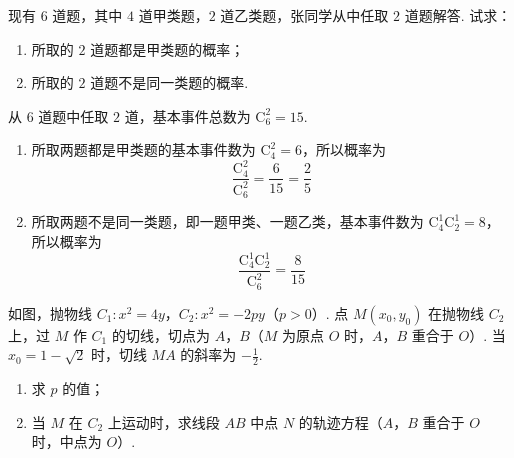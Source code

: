 \begin{problem}
现有 \(6\) 道题，其中 \(4\) 道甲类题，\(2\) 道乙类题，张同学从中任取 \(2\) 道题解答. 试求：

\begin{enumerate}
\item 所取的 \(2\) 道题都是甲类题的概率；
\item 所取的 \(2\) 道题不是同一类题的概率.
\end{enumerate}
\end{problem}

\begin{solution}
从 \(6\) 道题中任取 \(2\) 道，基本事件总数为
\(\mathrm C_6^2=15\).
\begin{enumerate}
\item 所取两题都是甲类题的基本事件数为 \(\mathrm C_4^2=6\)，所以概率为
\[
\frac{\mathrm C_4^2}{\mathrm C_6^2}=\frac6{15}=\frac25
\]

\item 所取两题不是同一类题，即一题甲类、一题乙类，基本事件数为
\(\mathrm C_4^1\mathrm C_2^1=8\)，所以概率为
\[
\frac{\mathrm C_4^1\mathrm C_2^1}{\mathrm C_6^2}=\frac8{15}
\]
\end{enumerate}
\end{solution}

\begin{problem}
如图，抛物线 \(C_{1}:x^{2} = 4y\)，\(C_{2}:x^{2} = -2py\)（\(p > 0\)）. 点 \(M(x_{0}, y_{0})\) 在抛物线 \(C_{2}\) 上，过 \(M\) 作 \(C_{1}\) 的切线，切点为 \(A\)，\(B\)（\(M\) 为原点 \(O\) 时，\(A\)，\(B\) 重合于 \(O\)）. 当 \(x_{0} = 1 - \sqrt{2}\) 时，切线 \(MA\) 的斜率为 \(-\frac{1}{2}\).

\begin{enumerate}
\item 求 \(p\) 的值；
\item 当 \(M\) 在 \(C_{2}\) 上运动时，求线段 \(AB\) 中点 \(N\) 的轨迹方程（\(A\)，\(B\) 重合于 \(O\) 时，中点为 \(O\)）.
\end{enumerate}

\end{problem}

